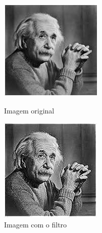 \documentclass[a4paper, 12pt]{article}
\begin{document}
\begin{figure}[!htb]
	\centering
	  \includegraphics[width=\linewidth]{images/einstein256.jpg}
	  \caption{Imagem original}
	\endminipage\hspace{1cm}
	  \includegraphics[width=\linewidth]{images/nitido.jpg}
	  \caption{Imagem com o filtro}
	\endminipage
\end{figure}
\end{document}
